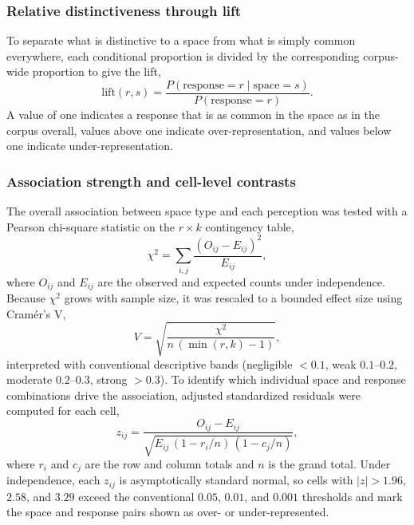 \documentclass[]{interact}
\begin{document}
\subsubsection{Relative distinctiveness through lift}\label{sec:methods-lift}
To separate what is distinctive to a space from what is simply common everywhere, each conditional proportion is divided by the corresponding corpus-wide proportion to give the lift,
\begin{equation}
\mathrm{lift}(r,s) = \frac{P(\mathrm{response}=r \mid \mathrm{space}=s)}{P(\mathrm{response}=r)}.
\end{equation}
A value of one indicates a response that is as common in the space as in the corpus overall, values above one indicate over-representation, and values below one indicate under-representation.

\subsubsection{Association strength and cell-level contrasts}\label{sec:methods-association}
The overall association between space type and each perception was tested with a Pearson chi-square statistic on the $r \times k$ contingency table,
\begin{equation}
\chi^{2} = \sum_{i,j} \frac{(O_{ij}-E_{ij})^{2}}{E_{ij}},
\end{equation}
where $O_{ij}$ and $E_{ij}$ are the observed and expected counts under independence.
Because $\chi^{2}$ grows with sample size, it was rescaled to a bounded effect size using Cram\'er's V,
\begin{equation}
V = \sqrt{\frac{\chi^{2}}{n\,(\min(r,k)-1)}},
\end{equation}
interpreted with conventional descriptive bands (negligible $<0.1$, weak $0.1$--$0.2$, moderate $0.2$--$0.3$, strong $>0.3$).
To identify which individual space and response combinations drive the association, adjusted standardized residuals were computed for each cell,
\begin{equation}
z_{ij} = \frac{O_{ij}-E_{ij}}{\sqrt{E_{ij}\,(1-r_{i}/n)\,(1-c_{j}/n)}},
\end{equation}
where $r_{i}$ and $c_{j}$ are the row and column totals and $n$ is the grand total.
Under independence, each $z_{ij}$ is asymptotically standard normal, so cells with $|z|>1.96$, $2.58$, and $3.29$ exceed the conventional $0.05$, $0.01$, and $0.001$ thresholds and mark the space and response pairs shown as over- or under-represented.
\end{document}
